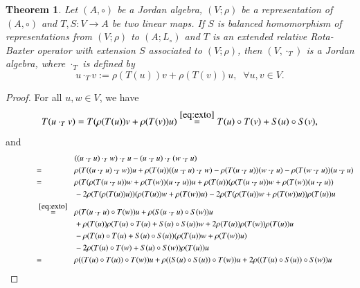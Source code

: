 \documentclass[12pt, reqno, a4paper]{amsart}
\newtheorem{theorem}{Theorem}[section]
\theoremstyle{definition}
\begin{document}
\begin{theorem}\label{thm:eo2ps}
	Let $(A, \circ)$ be a Jordan algebra, $(V; \rho)$ be a representation of $(A, \circ)$ and $T, S: V \to A$ be two linear maps.
	If $S$ is balanced homomorphism of representations from $(V; \rho)$ to $(A; L_{\circ})$ and $T$ is an extended relative Rota-Baxter operator with extension $S$ associated to $(V; \rho)$, then $(V, \cdot_{T})$ is a Jordan algebra, where $\cdot_{T}$ is defined by
	\begin{equation}
		u \cdot_{T} v:= \rho(T(u))v + \rho(T(v))u, \;\; \forall u, v \in V. \label{eq:o2nj}
	\end{equation}
\end{theorem}
\begin{proof}
	For all $u, w \in V$, we have
	\begin{equation*}
		T(u \cdot_{T} v) = T(\rho(T(u))v + \rho(T(v))u) \overset{\eqref{eq:exto}}{=} T(u) \circ T(v) + S(u) \circ S(v),
	\end{equation*}
	and
	\begin{align*}
		&((u \cdot_{T} u) \cdot_{T} w) \cdot_{T} u - (u \cdot_{T} u) \cdot_{T} (w \cdot_{T} u) \\
		\overset{\hphantom{\;\;\eqref{repJor1},\eqref{repJor2}\;\;}}{=}\; & \rho(T((u \cdot_{T} u) \cdot_{T} w))u + \rho(T(u))((u \cdot_{T} u) \cdot_{T} w) - \rho(T(u \cdot_{T} u))(w \cdot_{T} u) - \rho(T(w \cdot_{T} u)) (u \cdot_{T} u) \\
		\overset{\hphantom{\;\;\eqref{repJor1},\eqref{repJor2}\;\;}}{=}\; & \rho(T( \rho(T(u \cdot_{T} u))w + \rho(T(w))(u \cdot_{T} u)  )u + \rho(T(u))( \rho(T(u \cdot_{T} u))w + \rho(T(w))(u \cdot_{T} u) ) \\
		& - 2\rho(T( \rho(T(u))u ))( \rho(T(u))w + \rho(T(w))u ) - 2\rho(T( \rho(T(u))w + \rho(T(w))u )) \rho(T(u))u \\
		\overset{\;\;\;\eqref{eq:exto}\;\;\;}{=}\; & \rho(T(u \cdot_{T} u) \circ T(w))u +  \rho(S(u \cdot_{T} u) \circ S(w))u \\
		& + \rho(T(u)) \rho(T(u) \circ T(u) + S(u) \circ S(u) )w + 2\rho(T(u)) \rho(T(w))\rho(T(u))u \\
		& - \rho(T(u) \circ T(u) + S(u) \circ S(u))( \rho(T(u))w + \rho(T(w))u ) \\
		& - 2\rho(T(u) \circ T(w) + S(u) \circ S(w)) \rho(T(u))u \\
		\overset{\hphantom{\;\;\eqref{repJor1},\eqref{repJor2}\;\;}}{=}\; & \rho((T(u) \circ T(u)) \circ T(w)) u + \rho((S(u) \circ S(u)) \circ T(w)) u + 2 \rho((T(u) \circ S(u)) \circ S(w))u \\

\end{align*}
\end{proof}
\end{document}
